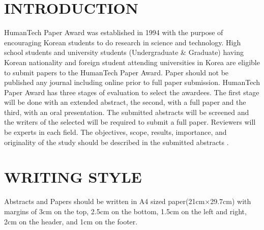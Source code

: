 \documentclass{abstract_hutech}
\begin{document}
\thispagestyle{firstpage}

\section{INTRODUCTION}
HumanTech Paper Award was established in 1994 with the purpose of encouraging Korean students to do research in science and technology. High school students and university students (Undergraduate \& Graduate) having Korean nationality and foreign student attending universities in Korea are eligible to submit papers to the HumanTech Paper Award. Paper should not be published any journal including online prior to full paper submission. HumanTech Paper Award has three stages of evaluation to select the awardees. The first stage will be done with an extended abstract, the second, with a full paper and the third, with an oral presentation. The submitted abstracts will be screened and the writers of the selected will be required to submit a full paper. Reviewers will be experts in each field. The objectives, scope, results, importance, and originality of the study should be described in the submitted abstracts \cite{braun2009optical}.

\section{WRITING STYLE}
Abstracts and Papers should be written in A4 sized paper(21cm$\times$29.7cm) with margins of 3cm on the top, 2.5cm on the bottom, 1.5cm on the left and right, 2cm on the header, and 1cm on the footer.
\end{document}
